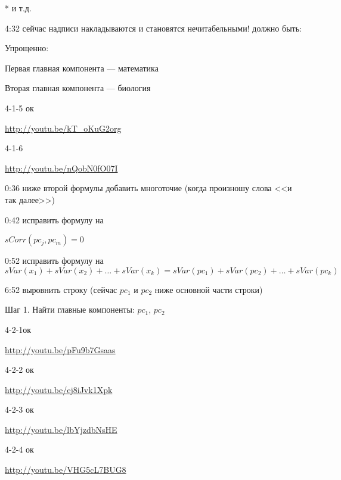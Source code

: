\documentclass[12pt,a4paper]{article}
\begin{document}
* и т.д.

4:32 сейчас надписи накладываются и становятся нечитабельными! должно быть:

Упрощенно:

Первая главная компонента --- математика

Вторая главная компонента --- биология

4-1-5 ок

\url{http://youtu.be/kT_oKuG2org}

4-1-6 

\url{http://youtu.be/nQobN0fO07I}

0:36 ниже второй формулы добавить многоточие (когда произношу слова <<и так далее>>)

0:42 исправить формулу на

$sCorr(pc_j, pc_m)=0$

0:52 исправить формулу на
\[
sVar(x_1)+ sVar(x_2) + \ldots + sVar(x_k) =
sVar(pc_1)+ sVar(pc_2) + \ldots + sVar(pc_k)
\]

6:52 выровнить строку (сейчас $pc_1$ и $pc_2$ ниже основной части строки)

Шаг 1. Найти главные компоненты: $pc_1$, $pc_2$

4-2-1ок

\url{http://youtu.be/pFu9b7Gsaas}

4-2-2 ок

\url{http://youtu.be/ej8iJvk1Xpk}

4-2-3 ок

\url{http://youtu.be/lbYjzdbNsHE}

4-2-4 ок

\url{http://youtu.be/VHG5cL7BUG8}
\end{document}
